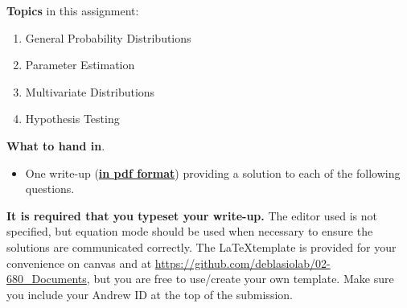 \noindent 
{\bf Topics} in this assignment: 
\begin{enumerate}
\item General Probability Distributions
\item Parameter Estimation
\item Multivariate Distributions
\item Hypothesis Testing
\end{enumerate}
\vspace{0.2in}


\noindent 
{\bf What to hand in}. 
\begin{itemize}
\item One write-up (\underline{\textbf{in pdf format}}) providing a solution to each of the following questions.
\end{itemize}

\textbf{It is required that you typeset your write-up.} 
The editor used is not specified, but equation mode should be used when necessary to ensure the solutions are communicated correctly.
The \LaTeX template is provided for your convenience on canvas and at \url{https://github.com/deblasiolab/02-680_Documents}, but you are free to use/create your own template. 
Make sure you include your Andrew ID at the top of the submission.\\


